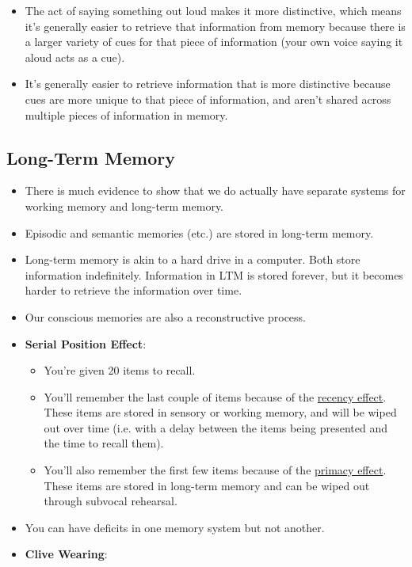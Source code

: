 \documentclass[]{article}
\newcommand{\lecture}[1]{\marginpar{{\footnotesize $\leftarrow$ \underline{#1}}}}
\begin{document}
\begin{itemize}
				\item The act of saying something out loud makes it more distinctive, which means it's generally easier to retrieve that information from memory because there is a larger variety of cues for that piece of information (your own voice saying it aloud acts as a cue).
				\item It's generally easier to retrieve information that is more distinctive because cues are more unique to that piece of information, and aren't shared across multiple pieces of information in memory.
			\end{itemize}

		\subsection{Long-Term Memory}
			\begin{itemize}
				\item There is much evidence to show that we do actually have separate systems for working memory and long-term memory.
				\item Episodic and semantic memories (etc.) are stored in long-term memory.
				\item Long-term memory is akin to a hard drive in a computer. Both store information indefinitely. Information in LTM is stored forever, but it becomes harder to retrieve the information over time.
				\item Our conscious memories are also a reconstructive process.
				\item \textbf{Serial Position Effect}:
					\begin{itemize}
						\item You're given 20 items to recall.
						\item You'll remember the last couple of items because of the \underline{recency effect}. These items are stored in sensory or working memory, and will be wiped out over time (i.e. with a delay between the items being presented and the time to recall them).
						\item You'll also remember the first few items because of the \underline{primacy effect}. These items are stored in long-term memory and can be wiped out through subvocal rehearsal.
					\end{itemize}
				\item You can have deficits in one memory system but not another. \lecture{February 7, 2013}
				\item \textbf{Clive Wearing}:
					\begin{itemize}

\end{itemize}
\end{itemize}
\end{document}
